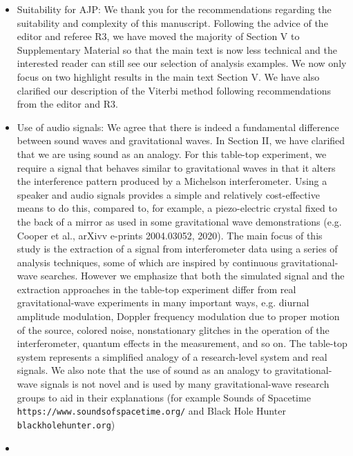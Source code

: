 \documentclass{article}
\newcommand{\han}{\textcolor{orange}}
\begin{document}
\begin{itemize}
\item Suitability for AJP: We thank you for the recommendations regarding the suitability and complexity of this manuscript. Following the advice of the editor and referee R3, we have moved the majority of Section V to Supplementary Material so that the main text is now less technical and the interested reader can still see our selection of analysis examples. We now only focus on two highlight results in the main text Section V. We have also clarified our description of the Viterbi method following recommendations from the editor and R3. 
\item Use of audio signals: We agree that there is indeed a fundamental difference between sound waves and gravitational waves. In Section II, we have clarified that we are using sound as an analogy. For this table-top experiment, we require a signal that behaves similar to gravitational waves in that it alters the interference pattern produced by a Michelson interferometer. Using a speaker and audio signals provides a simple and relatively cost-effective means to do this, compared to, for example, a piezo-electric crystal fixed to the back of a mirror as used in some gravitational wave demonstrations (e.g. Cooper et al., arXivv e-prints 2004.03052, 2020). The main focus of this study is the extraction of a signal from interferometer data using a series of analysis techniques, some of which are inspired by continuous gravitational-wave searches. However we emphasize that both the simulated signal and the extraction approaches in the table-top experiment differ from real gravitational-wave experiments in many important ways, e.g. diurnal amplitude modulation, Doppler frequency modulation due to proper motion of the source, colored noise, nonstationary glitches in the operation of the interferometer, quantum effects in the measurement, and so on. The table-top system represents a simplified analogy of a research-level system and real signals.  We also note that the use of sound as an analogy to gravitational-wave signals is not novel and is used by many gravitational-wave research groups to aid in their explanations (for example Sounds of Spacetime \texttt{https://www.soundsofspacetime.org/} and Black Hole Hunter \texttt{blackholehunter.org})
\item[]

\end{itemize}
\end{document}
